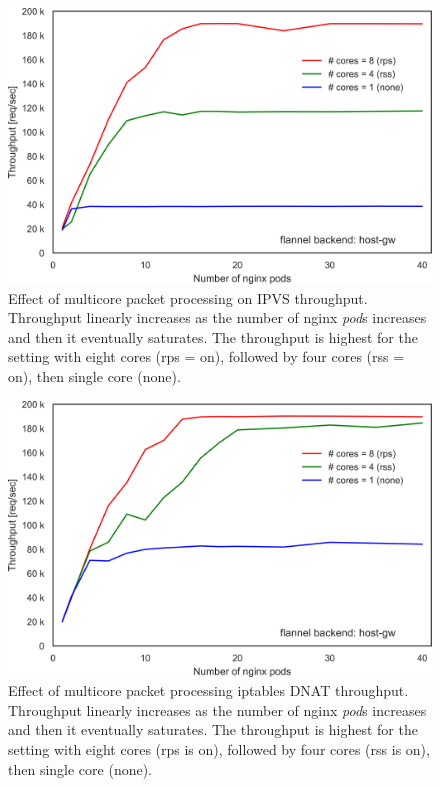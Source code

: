 \begin{figure}[h]
  \centering
  \includegraphics[width=0.75\columnwidth]{Figs/ipvs_mcore_proccessing}
  \par\bigskip
  \centering
  \begin{minipage}{0.9\columnwidth}
    \caption[Effect of multicore packet processing on IPVS throughput]{
Effect of multicore packet processing on IPVS throughput.
Throughput linearly increases as the number of nginx {\em pod}s increases and then it eventually saturates.
The throughput is highest for the setting with eight cores (rps = on), followed by four cores (rss = on), then single core (none).
    }
    \label{fig:ipvs_mcore_proccessing}
  \end{minipage}
\end{figure}


\begin{figure}[h]
  \centering
  \includegraphics[width=0.75\columnwidth]{Figs/iptables_mcore_proccessing}
  \par\bigskip
  \centering
  \begin{minipage}{0.9\columnwidth}
    \caption[Effect of multicore packet processing on iptables DNAT throughput]{
Effect of multicore packet processing iptables DNAT throughput.
Throughput linearly increases as the number of nginx {\em pod}s increases and then it eventually saturates.
The throughput is highest for the setting with eight cores (rps is on), followed by four cores (rss is on), then single core (none).
    }
    \label{fig:iptables_mcore_proccessing}
  \end{minipage}
\end{figure}


